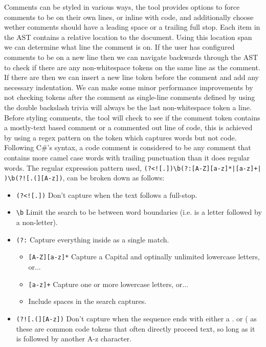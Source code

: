 Comments can be styled in various ways, the tool provides options to force comments to be on their own lines, or inline with code, and additionally choose wether comments should have a leading space or a trailing full stop. Each item in the AST contains a relative location to the document. Using this location span we can determine what line the comment is on. If the user has configured comments to be on a new line then we can navigate backwards through the AST to check if there are any non-whitespace tokens on the same line as the comment. If there are then we can insert a new line token before the comment and add any necessary indentation. We can make some minor performance improvements by not checking tokens after the comment as single-line comments defined by using the double backslash trivia will always be the last non-whitespace token a line.
Before styling comments, the tool will check to see if the comment token contains a mostly-text based comment or a commented out line of code, this is achieved by using a regex pattern on the token which captures words but not code. Following C\#'s syntax, a code comment is considered to be any comment that contains more camel case words with trailing punctuation than it does regular words. The regular expression pattern used, \texttt{(?<![.])\textbackslash b(?:[A-Z][a-z]*|[a-z]+| )\textbackslash b(?![.(][A-z])}, can be broken down as follows:
\begin{itemize}
    \item \texttt{(?<![.])} Don't capture when the text follows a full-stop.
    \item \texttt{\textbackslash b} Limit the search to be between word boundaries (i.e. is a letter followed by a non-letter).
    \item \texttt{(?:} Capture everything inside as a single match.
    \begin{itemize}
        \item \texttt{[A-Z][a-z]*} Capture a Capital and optinally unlimited lowercase letters, or...
        \item \texttt{[a-z]+} Capture one or more lowercase letters, or...
        \item Include spaces in the search captures.
    \end{itemize}
    \item \texttt{(?![.(][A-z])} Don't capture when the sequence ends with either a . or ( as these are common code tokens that often directly proceed text, so long as it is followed by another A-z character.
\end{itemize}

